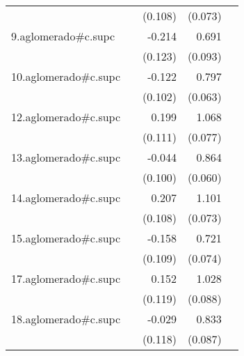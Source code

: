 {\begin{longtable}{l*{4}{D{.}{.}{-1}}}
            &                     &     (0.108)         &     (0.073)         &                     \\
\addlinespace
9.aglomerado#c.supc&                     &      -0.214         &       0.691\sym{***}&                     \\
            &                     &     (0.123)         &     (0.093)         &                     \\
\addlinespace
10.aglomerado#c.supc&                     &      -0.122         &       0.797\sym{***}&                     \\
            &                     &     (0.102)         &     (0.063)         &                     \\
\addlinespace
12.aglomerado#c.supc&                     &       0.199         &       1.068\sym{***}&                     \\
            &                     &     (0.111)         &     (0.077)         &                     \\
\addlinespace
13.aglomerado#c.supc&                     &      -0.044         &       0.864\sym{***}&                     \\
            &                     &     (0.100)         &     (0.060)         &                     \\
\addlinespace
14.aglomerado#c.supc&                     &       0.207         &       1.101\sym{***}&                     \\
            &                     &     (0.108)         &     (0.073)         &                     \\
\addlinespace
15.aglomerado#c.supc&                     &      -0.158         &       0.721\sym{***}&                     \\
            &                     &     (0.109)         &     (0.074)         &                     \\
\addlinespace
17.aglomerado#c.supc&                     &       0.152         &       1.028\sym{***}&                     \\
            &                     &     (0.119)         &     (0.088)         &                     \\
\addlinespace
18.aglomerado#c.supc&                     &      -0.029         &       0.833\sym{***}&                     \\
            &                     &     (0.118)         &     (0.087)         &                     \\

\end{longtable}}

